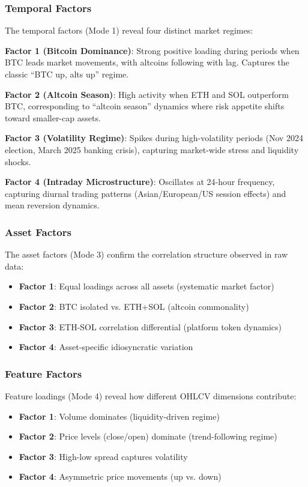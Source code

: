\documentclass{article}
\begin{document}
\subsubsection{Temporal Factors}

The temporal factors (Mode 1) reveal four distinct market regimes:

\textbf{Factor 1 (Bitcoin Dominance)}: Strong positive loading during periods when BTC leads market movements, with altcoins following with lag. Captures the classic ``BTC up, alts up'' regime.

\textbf{Factor 2 (Altcoin Season)}: High activity when ETH and SOL outperform BTC, corresponding to ``altcoin season'' dynamics where risk appetite shifts toward smaller-cap assets.

\textbf{Factor 3 (Volatility Regime)}: Spikes during high-volatility periods (Nov 2024 election, March 2025 banking crisis), capturing market-wide stress and liquidity shocks.

\textbf{Factor 4 (Intraday Microstructure)}: Oscillates at 24-hour frequency, capturing diurnal trading patterns (Asian/European/US session effects) and mean reversion dynamics.

\subsubsection{Asset Factors}

The asset factors (Mode 3) confirm the correlation structure observed in raw data:

\begin{itemize}[leftmargin=*]
    \item \textbf{Factor 1}: Equal loadings across all assets (systematic market factor)
    \item \textbf{Factor 2}: BTC isolated vs. ETH+SOL (altcoin commonality)
    \item \textbf{Factor 3}: ETH-SOL correlation differential (platform token dynamics)
    \item \textbf{Factor 4}: Asset-specific idiosyncratic variation
\end{itemize}

\subsubsection{Feature Factors}

Feature loadings (Mode 4) reveal how different OHLCV dimensions contribute:

\begin{itemize}[leftmargin=*]
    \item \textbf{Factor 1}: Volume dominates (liquidity-driven regime)
    \item \textbf{Factor 2}: Price levels (close/open) dominate (trend-following regime)
    \item \textbf{Factor 3}: High-low spread captures volatility
    \item \textbf{Factor 4}: Asymmetric price movements (up vs. down)
\end{itemize}
\end{document}
